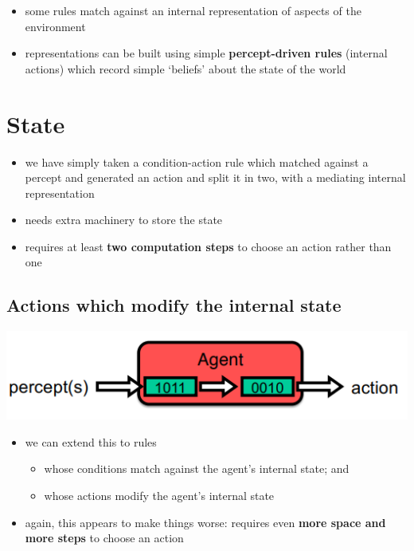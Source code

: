 \documentclass{article}
\begin{document}
\begin{multicols}{2}
\begin{itemize}
  \item some rules match against an internal representation of aspects of the environment 
  \item representations can be built using simple \textbf{percept-driven rules} (internal actions) which record simple ‘beliefs’ about the state of the world
\end{itemize}

\end{multicols}

\section{State}

\begin{itemize}
  \item we have simply taken a condition-action rule which matched against a percept and generated an action and split it in two, with a mediating internal representation 
  \item needs extra machinery to store the state 
  \item requires at least \textbf{two computation steps} to choose an action rather than one
\end{itemize}

\subsection{Actions which modify the internal state}

\includegraphics[scale=0.5]{reactive_state_agent_modify.png}

\begin{itemize}
  \item we can extend this to rules
  \begin{itemize}
    \item whose conditions match against the agent’s internal state; and
    \item whose actions modify the agent’s internal state 
  \end{itemize}
  \item again, this appears to make things worse: requires even \textbf{more space and more steps} to choose an action
\end{itemize}
\end{document}
